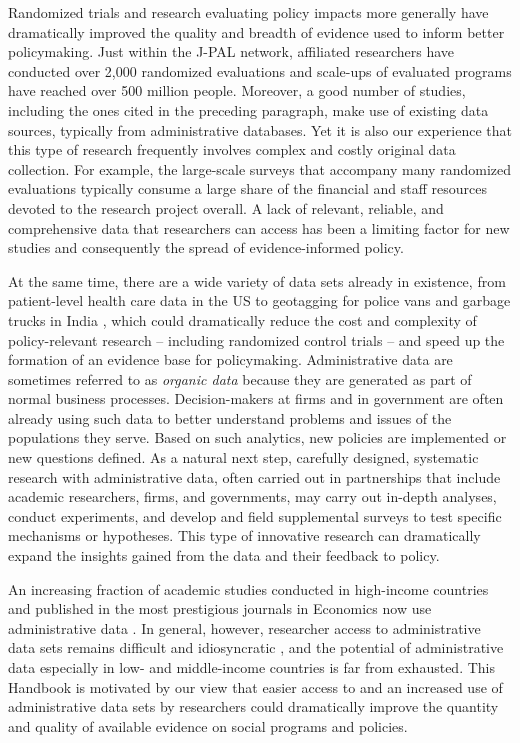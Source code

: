 Randomized trials and research evaluating policy impacts more generally have dramatically improved the quality and breadth of evidence used to inform better policymaking. Just within the J-PAL network, affiliated researchers have conducted over 2,000 randomized evaluations and scale-ups of evaluated programs have reached over 500 million people. Moreover, a good number of studies, including the ones cited in the preceding paragraph, make use of existing data sources, typically from administrative databases. Yet it is also our experience that this type of research frequently involves complex and costly original data collection. For example, the large-scale surveys that accompany many randomized evaluations typically consume a large share of the financial and staff resources devoted to the research project overall. A lack of relevant, reliable, and comprehensive data that researchers can access has been a limiting factor for new studies and consequently the spread of evidence-informed policy.

At the same time, there are a wide variety of data sets already in existence, from patient-level health care data in the US to geotagging for police vans and garbage trucks in India \citep{doshi2016, thetimesofindia2020}, which could dramatically reduce the cost and complexity of policy-relevant research -- including randomized control trials -- and speed up the formation of an evidence base for policymaking. Administrative data are sometimes referred to as \emph{organic data} \citep{groves2011} because they are generated as part of normal business processes. Decision-makers at firms and in government are often already using such data to better understand problems and issues of the populations they serve. Based on such analytics, new policies are implemented or new questions defined. As a natural next step, carefully designed, systematic research with administrative data, often carried out in partnerships that include academic researchers, firms, and governments, may carry out in-depth analyses, conduct experiments, and develop and field supplemental surveys to test specific mechanisms or hypotheses. This type of innovative research can dramatically expand the insights gained from the data and their feedback to policy.

An increasing fraction of academic studies conducted in high-income countries and published in the most prestigious journals in Economics now use administrative data \citetext{\citealp[see Figure \ref{fig:introchetty};][]{chetty2012}; \citealp[and][]{einav2014}}. In general, however, researcher access to administrative data sets remains difficult and idiosyncratic \citep{card2010}, and the potential of administrative data especially in low- and middle-income countries is far from exhausted. This Handbook is motivated by our view that easier access to and an increased use of administrative data sets by researchers could dramatically improve the quantity and quality of available evidence on social programs and policies.


